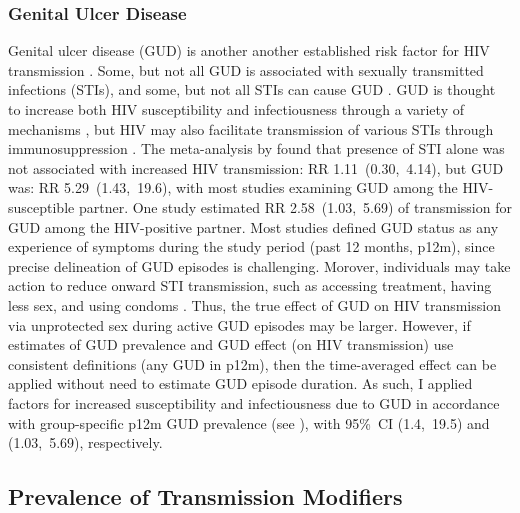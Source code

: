 \subsubsection{Genital Ulcer Disease}\label{model.par.beta.gud}
Genital ulcer disease (GUD)
is another another established risk factor for HIV transmission \cite{Plummer1991,Fleming1999}.
Some, but not all GUD is associated with sexually transmitted infections (STIs),
and some, but not all STIs can cause GUD \cite{Fleming1999}.
GUD is thought to increase both HIV susceptibility and infectiousness
through a variety of mechanisms \cite{Fleming1999,Sheffield2007,Fox2010},
but HIV may also facilitate transmission of various STIs
through immunosuppression \cite{Wasserheit1992}.
The meta-analysis by \citet{Boily2009} found that
presence of STI alone was not associated with increased HIV transmission: RR 1.11~(0.30,~4.14),
but GUD was: RR 5.29~(1.43,~19.6),
with most studies examining GUD among the HIV-susceptible partner.
One study \cite{Gray2001} estimated RR 2.58~(1.03,~5.69) of transmission
for GUD among the HIV-positive partner.
Most studies defined GUD status as any experience of symptoms during the study period
(\eg past 12 months, p12m),
since precise delineation of GUD episodes is challenging.
Morover, individuals may take action to reduce onward STI transmission,
such as accessing treatment, having less sex, and using condoms \cite{SDHS2006}.
Thus, the true effect of GUD on HIV transmission
via unprotected sex during active GUD episodes may be larger.
However, if estimates of GUD prevalence and GUD effect (on HIV transmission)
use consistent definitions (\eg any GUD in p12m),
then the time-averaged effect can be applied without need to estimate GUD episode duration.
As such, I applied factors for increased susceptibility and infectiousness due to GUD
in accordance with group-specific p12m GUD prevalence (see ),
with 95\%~CI (1.4,~19.5) and (1.03,~5.69), respectively.
\subsection{Prevalence of Transmission Modifiers}\label{model.par.tm}
